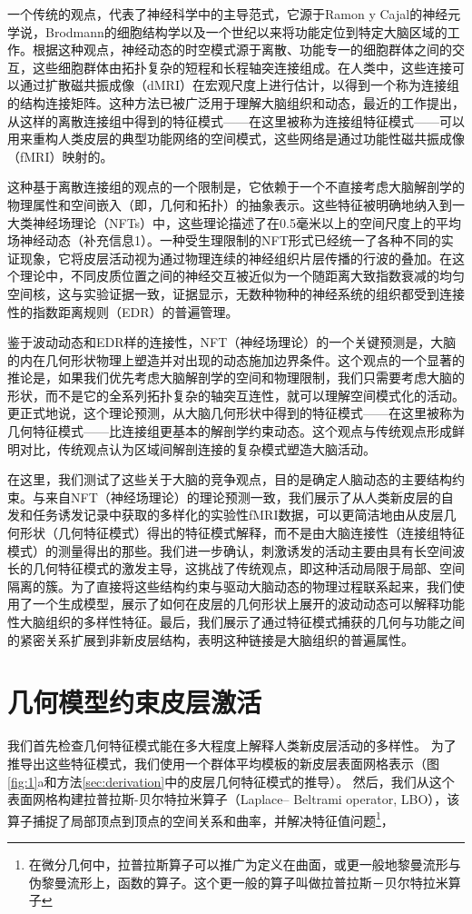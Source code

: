 \documentclass[lang=cn,a4paper,newtx]{elegantpaper}
\begin{document}
一个传统的观点，代表了神经科学中的主导范式，它源于Ramon y Cajal的神经元学说，Brodmann的细胞结构学以及一个世纪以来将功能定位到特定大脑区域的工作。根据这种观点，神经动态的时空模式源于离散、功能专一的细胞群体之间的交互，这些细胞群体由拓扑复杂的短程和长程轴突连接组成。在人类中，这些连接可以通过扩散磁共振成像（dMRI）在宏观尺度上进行估计，以得到一个称为连接组的结构连接矩阵。这种方法已被广泛用于理解大脑组织和动态，最近的工作提出，从这样的离散连接组中得到的特征模式——在这里被称为连接组特征模式——可以用来重构人类皮层的典型功能网络的空间模式，这些网络是通过功能性磁共振成像（fMRI）映射的。

这种基于离散连接组的观点的一个限制是，它依赖于一个不直接考虑大脑解剖学的物理属性和空间嵌入（即，几何和拓扑）的抽象表示。这些特征被明确地纳入到一大类神经场理论（NFTs）中，这些理论描述了在0.5毫米以上的空间尺度上的平均场神经动态（补充信息1）。一种受生理限制的NFT形式已经统一了各种不同的实证现象，它将皮层活动视为通过物理连续的神经组织片层传播的行波的叠加。在这个理论中，不同皮质位置之间的神经交互被近似为一个随距离大致指数衰减的均匀空间核，这与实验证据一致，证据显示，无数种物种的神经系统的组织都受到连接性的指数距离规则（EDR）的普遍管理。

鉴于波动动态和EDR样的连接性，NFT（神经场理论）的一个关键预测是，大脑的内在几何形状物理上塑造并对出现的动态施加边界条件。这个观点的一个显著的推论是，如果我们优先考虑大脑解剖学的空间和物理限制，我们只需要考虑大脑的形状，而不是它的全系列拓扑复杂的轴突互连性，就可以理解空间模式化的活动。更正式地说，这个理论预测，从大脑几何形状中得到的特征模式——在这里被称为几何特征模式——比连接组更基本的解剖学约束动态。这个观点与传统观点形成鲜明对比，传统观点认为区域间解剖连接的复杂模式塑造大脑活动。

在这里，我们测试了这些关于大脑的竞争观点，目的是确定人脑动态的主要结构约束。与来自NFT（神经场理论）的理论预测一致，我们展示了从人类新皮层的自发和任务诱发记录中获取的多样化的实验性fMRI数据，可以更简洁地由从皮层几何形状（几何特征模式）得出的特征模式解释，而不是由大脑连接性（连接组特征模式）的测量得出的那些。我们进一步确认，刺激诱发的活动主要由具有长空间波长的几何特征模式的激发主导，这挑战了传统观点，即这种活动局限于局部、空间隔离的簇。为了直接将这些结构约束与驱动大脑动态的物理过程联系起来，我们使用了一个生成模型，展示了如何在皮层的几何形状上展开的波动动态可以解释功能性大脑组织的多样性特征。最后，我们展示了通过特征模式捕获的几何与功能之间的紧密关系扩展到非新皮层结构，表明这种链接是大脑组织的普遍属性。

\section{几何模型约束皮层激活}
我们首先检查几何特征模式能在多大程度上解释人类新皮层活动的多样性。
为了推导出这些特征模式，我们使用一个群体平均模板的新皮层表面网格表示（图\ref{fig:1}a和方法\ref{sec:derivation}中的皮层几何特征模式的推导）。
然后，我们从这个表面网格构建拉普拉斯-贝尔特拉米算子（Laplace–
Beltrami operator, LBO），该算子捕捉了局部顶点到顶点的空间关系和曲率，并解决特征值问题\footnote{在微分几何中，拉普拉斯算子可以推广为定义在曲面，或更一般地黎曼流形与伪黎曼流形上，函数的算子。这个更一般的算子叫做拉普拉斯－贝尔特拉米算子}，
\end{document}
